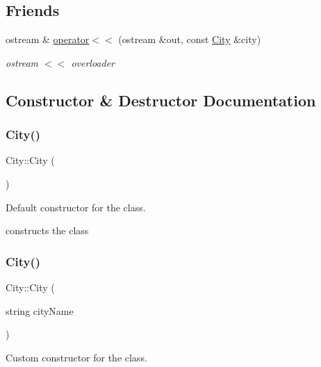 \subsection*{Friends}
\begin{DoxyCompactItemize}
\item 
ostream \& \hyperlink{class_city_a3d76003bb85bc7dd3f9fd5630287cb77}{operator$<$$<$} (ostream \&out, const \hyperlink{class_city}{City} \&city)
\begin{DoxyCompactList}\small\item\em ostream $<$$<$ overloader \end{DoxyCompactList}\end{DoxyCompactItemize}


\subsection{Constructor \& Destructor Documentation}
\hypertarget{class_city_a1b1f549430f0a7ecd0ec7b1605415193}{}\label{class_city_a1b1f549430f0a7ecd0ec7b1605415193} 
\subsubsection{\texorpdfstring{City()}{City()}\hspace{0.1cm}{\footnotesize\ttfamily [1/3]}}
{\footnotesize\ttfamily City\+::\+City (\begin{DoxyParamCaption}{ }\end{DoxyParamCaption})}



Default constructor for the class. 

constructs the class \hypertarget{class_city_a229bbfb90d196dd02a9699625bb86ae5}{}\label{class_city_a229bbfb90d196dd02a9699625bb86ae5} 
\subsubsection{\texorpdfstring{City()}{City()}\hspace{0.1cm}{\footnotesize\ttfamily [2/3]}}
{\footnotesize\ttfamily City\+::\+City (\begin{DoxyParamCaption}\item[{string}]{city\+Name }\end{DoxyParamCaption})}



Custom constructor for the class. 

